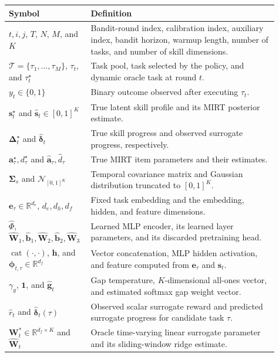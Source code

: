 \begin{center}
\small
\begin{tabular}{p{0.24\linewidth}p{0.67\linewidth}}
\hline
Symbol & Definition \\
\hline
\(t,i,j\), \(T\), \(N\), \(M\), and \(K\) & Bandit-round index, calibration index, auxiliary index, bandit horizon, warmup length, number of tasks, and number of skill dimensions. \\
\(\mathcal{T}=\{\tau_1,\ldots,\tau_M\}\), \(\tau_t\), and \(\tau_t^\star\) & Task pool, task selected by the policy, and dynamic oracle task at round \(t\). \\
\(y_t\in\{0,1\}\) & Binary outcome observed after executing \(\tau_t\). \\
\(\mathbf{s}_t^\star\) and \(\widehat{\mathbf{s}}_t\in[0,1]^K\) & True latent skill profile and its MIRT posterior estimate. \\
\(\boldsymbol{\Delta}_t^\star\) and \(\widehat{\boldsymbol{\delta}}_t\) & True skill progress and observed surrogate progress, respectively. \\
\(\mathbf{a}_\tau^\star,d_\tau^\star\) and \(\widehat{\mathbf{a}}_\tau,\widehat d_\tau\) & True MIRT item parameters and their estimates. \\
\(\boldsymbol{\Sigma}_s\) and \(\mathcal{N}_{[0,1]^K}\) & Temporal covariance matrix and Gaussian distribution truncated to \([0,1]^K\). \\
\(\mathbf{e}_\tau\in\mathbb{R}^{d_e}\), \(d_e,d_h,d_f\) & Fixed task embedding and the embedding, hidden, and feature dimensions. \\
\(\widehat\Phi\), \(\widehat{\mathbf{W}}_1,\widehat{\mathbf{b}}_1,\widehat{\mathbf{W}}_2,\widehat{\mathbf{b}}_2,\widehat{\mathbf{W}}_3\) & Learned MLP encoder, its learned layer parameters, and its discarded pretraining head. \\
\(\operatorname{cat}(\cdot,\cdot)\), \(\mathbf{h}\), and \(\boldsymbol{\phi}_{t,\tau}\in\mathbb{R}^{d_f}\) & Vector concatenation, MLP hidden activation, and feature computed from \(\mathbf{e}_\tau\) and \(\widehat{\mathbf{s}}_t\). \\
\(\gamma_g\), \(\mathbf{1}\), and \(\widehat{\mathbf{g}}_t\) & Gap temperature, \(K\)-dimensional all-ones vector, and estimated softmax gap weight vector. \\
\(\widehat r_t\) and \(\widehat{\boldsymbol{\delta}}_t(\tau)\) & Observed scalar surrogate reward and predicted surrogate progress for candidate task \(\tau\). \\
\(\mathbf{W}_t^*\in\mathbb{R}^{d_f\times K}\) and \(\widehat{\mathbf{W}}_t\) & Oracle time-varying linear surrogate parameter and its sliding-window ridge estimate. \\

\end{tabular}
\end{center}
